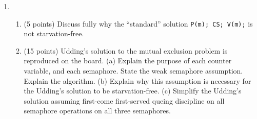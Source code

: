 \begin{enumerate}
\item
\begin{enumerate}
\item (5 points) Discuss fully why the ``standard''
solution\quad
{\quad \tt P(m); CS; V(m);}\quad
is not starvation-free.
\item (15 points) Udding's solution to the mutual exclusion problem is
reproduced on the board.  (a) Explain the purpose of each counter variable,
and each semaphore.  State the weak semaphore assumption.  Explain the
algorithm. (b) Explain why this assumption is necessary for the
Udding's solution to be starvation-free.  (c) Simplify the Udding's
solution assuming first-come first-served queing discipline on all
semaphore operations on all three semaphores.
\end{enumerate}

\end{enumerate}

